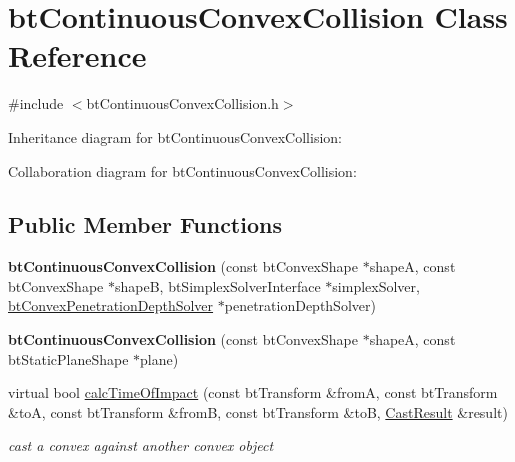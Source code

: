 \hypertarget{classbt_continuous_convex_collision}{\section{bt\+Continuous\+Convex\+Collision Class Reference}
\label{classbt_continuous_convex_collision}
}


{\ttfamily \#include $<$bt\+Continuous\+Convex\+Collision.\+h$>$}



Inheritance diagram for bt\+Continuous\+Convex\+Collision\+:


Collaboration diagram for bt\+Continuous\+Convex\+Collision\+:
\subsection*{Public Member Functions}
\begin{DoxyCompactItemize}
\item 
\hypertarget{classbt_continuous_convex_collision_a6c89f3b4ba10699790f486c1ab278159}{{\bfseries bt\+Continuous\+Convex\+Collision} (const bt\+Convex\+Shape $\ast$shape\+A, const bt\+Convex\+Shape $\ast$shape\+B, bt\+Simplex\+Solver\+Interface $\ast$simplex\+Solver, \hyperlink{classbt_convex_penetration_depth_solver}{bt\+Convex\+Penetration\+Depth\+Solver} $\ast$penetration\+Depth\+Solver)}\label{classbt_continuous_convex_collision_a6c89f3b4ba10699790f486c1ab278159}

\item 
\hypertarget{classbt_continuous_convex_collision_a5ee898b00f7a69d8815a4a9e90bef415}{{\bfseries bt\+Continuous\+Convex\+Collision} (const bt\+Convex\+Shape $\ast$shape\+A, const bt\+Static\+Plane\+Shape $\ast$plane)}\label{classbt_continuous_convex_collision_a5ee898b00f7a69d8815a4a9e90bef415}

\item 
virtual bool \hyperlink{classbt_continuous_convex_collision_afc75a57bddfeded52781bbd65ee16f37}{calc\+Time\+Of\+Impact} (const bt\+Transform \&from\+A, const bt\+Transform \&to\+A, const bt\+Transform \&from\+B, const bt\+Transform \&to\+B, \hyperlink{structbt_convex_cast_1_1_cast_result}{Cast\+Result} \&result)
\begin{DoxyCompactList}\small\item\em cast a convex against another convex object \end{DoxyCompactList}\end{DoxyCompactItemize}


